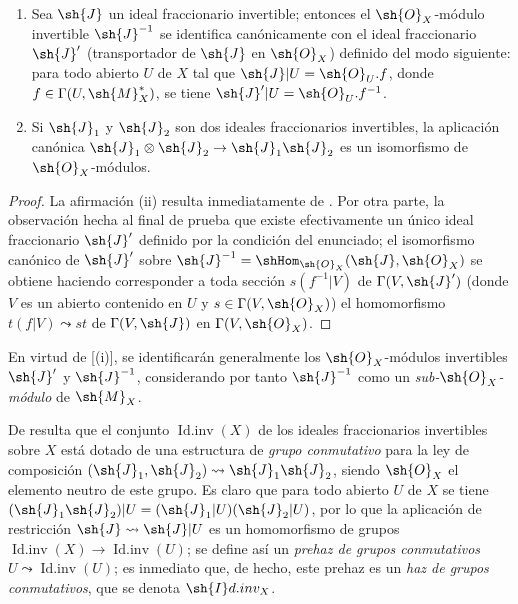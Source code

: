 \begin{corollary}[21.2.3]
\label{IV.21.2.3}
\begin{enumerate}[label=\textup{(\roman*)}]
  \item Sea $\sh{J}$ un ideal fraccionario invertible;
  entonces el $\sh{O}_X$-módulo invertible $\sh{J}^{-1}$ se identifica canónicamente con el ideal fraccionario $\sh{J}'$ (transportador de $\sh{J}$ en $\sh{O}_X$) definido del modo siguiente: para todo abierto $U$ de $X$ tal que $\sh{J}|U=\sh{O}_U.f$, donde $f\in\Gamma(U,\sh{M}_X^*)$, se tiene $\sh{J}'|U=\sh{O}_U.f^{-1}$.
  \item Si $\sh{J}_1$ y $\sh{J}_2$ son dos ideales fraccionarios invertibles, la aplicación canónica $\sh{J}_1\otimes\sh{J}_2\to\sh{J}_1\sh{J}_2$ es un isomorfismo de $\sh{O}_X$-módulos.
\end{enumerate}
\end{corollary}

\begin{proof}
La afirmación (ii) resulta inmediatamente de .
Por otra parte, la observación hecha al final de  prueba que existe efectivamente un único ideal fraccionario $\sh{J}'$ definido por la condición del enunciado;
el isomorfismo canónico de $\sh{J}'$ sobre $\sh{J}^{-1}=\shHom_{\sh{O}_X}(\sh{J},\sh{O}_X)$ se obtiene haciendo corresponder a toda sección $s(f^{-1}|V)$ de $\Gamma(V,\sh{J}')$ (donde $V$ es un abierto contenido en $U$ y $s\in\Gamma(V,\sh{O}_X)$) el homomorfismo $t(f|V)\leadsto st$ de $\Gamma(V,\sh{J})$ en $\Gamma(V,\sh{O}_X)$.
\end{proof}

En virtud de [(i)], se identificarán generalmente los $\sh{O}_X$-módulos invertibles $\sh{J}'$ y $\sh{J}^{-1}$, considerando por tanto $\sh{J}^{-1}$ como un \emph{sub-$\sh{O}_X$-módulo} de $\sh{M}_X$.

\begin{env}[21.2.4]
\label{IV.21.2.4}
De  resulta que el conjunto $\operatorname{Id.inv}(X)$ de los ideales fraccionarios invertibles sobre $X$ está dotado de una estructura de \emph{grupo conmutativo} para la ley de composición $(\sh{J}_1,\sh{J}_2)\leadsto\sh{J}_1\sh{J}_2$, siendo $\sh{O}_X$ el elemento neutro de este grupo.
Es claro que para todo abierto $U$ de $X$ se tiene $(\sh{J}_1\sh{J}_2)|U=(\sh{J}_1|U)(\sh{J}_2|U)$, por lo que la aplicación de restricción $\sh{J}\leadsto\sh{J}|U$ es un homomorfismo de grupos $\operatorname{Id.inv}(X)\to\operatorname{Id.inv}(U)$;
se define así un \emph{prehaz de grupos conmutativos} $U\leadsto\operatorname{Id.inv}(U)$;
es inmediato que, de hecho, este prehaz es un \emph{haz de grupos conmutativos}, que se denota $\sh{I}d.inv_X$.
\end{env}

